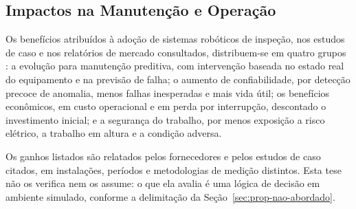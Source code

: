 \subsection{Impactos na Manutenção e Operação}

Os benefícios atribuídos à adoção de sistemas robóticos de inspeção, nos estudos de caso
e nos relatórios de mercado consultados, distribuem-se em quatro grupos
\cite{Wei2024Advancements, GlobalGrowthInsights2024}: a evolução para manutenção
preditiva, com intervenção baseada no estado real do equipamento e na previsão de falha;
o aumento de confiabilidade, por detecção precoce de anomalia, menos falhas inesperadas e
mais vida útil; os benefícios econômicos, em custo operacional e em perda por
interrupção, descontado o investimento inicial; e a segurança do trabalho, por menos
exposição a risco elétrico, a trabalho em altura e a condição adversa.

Os ganhos listados são relatados pelos fornecedores e pelos estudos de caso citados, em instalações, períodos e metodologias de medição distintos. Esta tese não os verifica nem os assume: o que ela avalia é uma lógica de decisão em ambiente simulado, conforme a delimitação da Seção~\ref{sec:prop-nao-abordado}.

